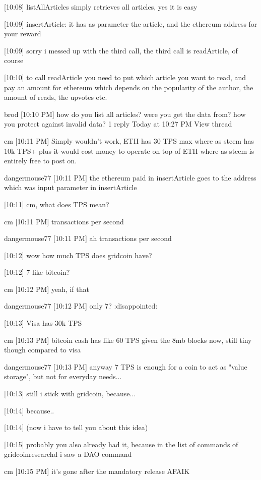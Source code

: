 {[10:08] 
listAllArticles simply retrieves all articles, yes it is easy


[10:09] 
insertArticle: it has as parameter the article, and the ethereum address for your reward


[10:09] 
sorry i messed up with the third call, the third call is readArticle, of course


[10:10] 
to call readArticle you need to put which article you want to read, and pay an amount for ethereum which depends on the popularity of the author, the amount of reads, the upvotes etc.


brod 
[10:10 PM] 
how do you list all articles? were you get the data from? how you protect against invalid data?
1 reply Today at 10:27 PM View thread


cm 
[10:11 PM] 
Simply wouldn't work, ETH has 30 TPS max where as steem has 10k TPS+ plus it would cost money to operate on top of ETH where as steem is entirely free to post on.


dangermouse77 [10:11 PM] 
the ethereum paid in insertArticle goes to the address which was input parameter in insertArticle


[10:11] 
cm, what does TPS mean?


cm 
[10:11 PM] 
transactions per second


dangermouse77 [10:11 PM] 
ah transactions per second


[10:12] 
wow how much TPS does gridcoin have?


[10:12] 
7 like bitcoin?


cm 
[10:12 PM] 
yeah, if that


dangermouse77 [10:12 PM] 
only 7? :disappointed:


[10:13] 
Visa has 30k TPS


cm 
[10:13 PM] 
bitcoin cash has like 60 TPS given the 8mb blocks now, still tiny though compared to visa


dangermouse77 [10:13 PM] 
anyway 7 TPS is enough for a coin to act as "value storage", but not for everyday needs...


[10:13] 
still i stick with gridcoin, because...


[10:14] 
because..


[10:14] 
(now i have to tell you about this idea)


[10:15] 
probably you also already had it, because in the list of commands of gridcoinresearchd i saw a DAO command


cm 
[10:15 PM] 
it's gone after the mandatory release AFAIK


}

